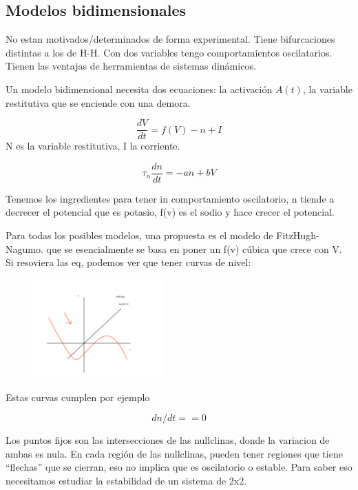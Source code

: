 \subsection{Modelos bidimensionales}

No estan motivados/determinados de forma experimental. Tiene bifurcaciones distintas a los de H-H. Con dos variables tengo comportamientos oscilatarios. Tienen las ventajas de herramientas de sistemas dinámicos. 

Un modelo bidimensional necesita dos ecuaciones: la activación $A(t)$, la variable restitutiva que se enciende con una demora.

\begin{equation}
	\frac{dV}{dt} = f(V) -n + I
\end{equation}
N es la variable restitutiva, I la corriente.

\begin{equation}
	\tau_n \frac{dn}{dt}= -an + bV
\end{equation}

Tenemos los ingredientes para tener in comportamiento oscilatorio, n tiende a decrecer el potencial que es potasio, f(v) es el sodio y hace crecer el potencial. 

Para todas los posibles modelos, una propuesta es el modelo de FitzHugh-Nagumo. que se esencialmente se basa en poner un f(v) cúbica que crece con  V. Si resoviera las eq, podemos ver que tener curvas de nivel:

\begin{figure}[htbp]
	\centering
	\includegraphics[width=0.45\textwidth]{1.png}
\end{figure}
Estas curvas cumplen por ejemplo

\begin{equation}
	dn/dt ==0 
\end{equation}

Los puntos fijos son las intersecciones de las nullclinas, donde la variacion de ambas es nula. En cada región de las nullclinas, pueden tener regiones que tiene ``flechas'' que se cierran, eso no implica que es oscilatorio o estable. Para saber eso necesitamos estudiar la estabilidad de un sistema de 2x2. 

